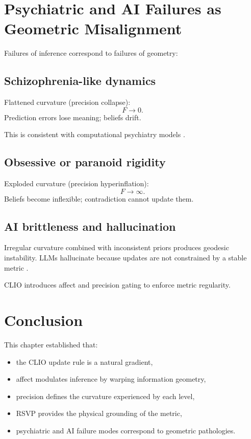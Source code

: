 \documentclass[12pt,oneside]{book}
\theoremstyle{plain}
\theoremstyle{definition}
\let\citep\parencite
\begin{document}
\section{Psychiatric and AI Failures as Geometric Misalignment}

Failures of inference correspond to failures of geometry:

\subsection{Schizophrenia-like dynamics}

Flattened curvature (precision collapse):
\[
F \rightarrow 0.
\]
Prediction errors lose meaning; beliefs drift.

This is consistent with computational psychiatry models
\citep{montague2012computational,corlett2016prediction}.

\subsection{Obsessive or paranoid rigidity}

Exploded curvature (precision hyperinflation):
\[
F \rightarrow \infty.
\]
Beliefs become inflexible; contradiction cannot update them.

\subsection{AI brittleness and hallucination}

Irregular curvature combined with inconsistent priors produces geodesic
instability.
LLMs hallucinate because updates are not constrained by a stable metric
\citep{kirchner2023hallucinations}.

CLIO introduces affect and precision gating to enforce metric regularity.

\section{Conclusion}

This chapter established that:

\begin{itemize}
    \item the CLIO update rule is a natural gradient,
    \item affect modulates inference by warping information geometry,
    \item precision defines the curvature experienced by each level,
    \item RSVP provides the physical grounding of the metric,
    \item psychiatric and AI failure modes correspond to geometric pathologies.
\end{itemize}
\end{document}
